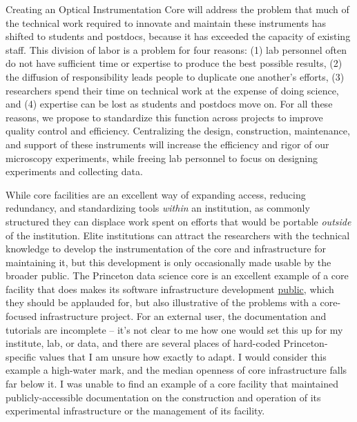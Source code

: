 \begin{leftbar}
Creating an Optical Instrumentation Core will address the problem that
much of the technical work required to innovate and maintain these
instruments has shifted to students and postdocs, because it has
exceeded the capacity of existing staff. This division of labor is a
problem for four reasons: (1) lab personnel often do not have sufficient
time or expertise to produce the best possible results, (2) the
diffusion of responsibility leads people to duplicate one another's
efforts, (3) researchers spend their time on technical work at the
expense of doing science, and (4) expertise can be lost as students and
postdocs move on. For all these reasons, we propose to standardize this
function across projects to improve quality control and efficiency.
Centralizing the design, construction, maintenance, and support of these
instruments will increase the efficiency and rigor of our microscopy
experiments, while freeing lab personnel to focus on designing
experiments and collecting data.
\end{leftbar}

While core facilities are an excellent way of expanding access, reducing
redundancy, and standardizing tools \emph{within} an institution, as
commonly structured they can displace work spent on efforts that would
be portable \emph{outside} of the institution. Elite institutions can
attract the researchers with the technical knowledge to develop the
instrumentation of the core and infrastructure for maintaining it, but
this development is only occasionally made usable by the broader public.
The Princeton data science core is an excellent example of a core
facility that does makes its software infrastructure development
\href{https://github.com/BrainCOGS}{public}, which they should be applauded for, but also
illustrative of the problems with a core-focused infrastructure project.
For an external user, the documentation and tutorials are incomplete --
it's not clear to me how one would set this up for my institute, lab, or
data, and there are several places of hard-coded Princeton-specific
values that I am unsure how exactly to adapt. I would
consider this example a high-water mark, and the median openness of core
infrastructure falls far below it. I was unable to find an example of a
core facility that maintained publicly-accessible documentation on the
construction and operation of its experimental infrastructure or the
management of its facility.

